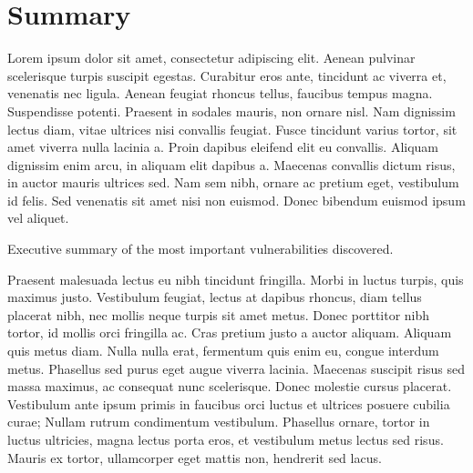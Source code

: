 \chapter{Summary}
Lorem ipsum dolor sit amet, consectetur adipiscing elit. Aenean pulvinar scelerisque turpis suscipit egestas. Curabitur eros ante, tincidunt ac viverra et, venenatis nec ligula. Aenean feugiat rhoncus tellus, faucibus tempus magna. Suspendisse potenti. Praesent in sodales mauris, non ornare nisl. Nam dignissim lectus diam, vitae ultrices nisi convallis feugiat. Fusce tincidunt varius tortor, sit amet viverra nulla lacinia a. Proin dapibus eleifend elit eu convallis. Aliquam dignissim enim arcu, in aliquam elit dapibus a. Maecenas convallis dictum risus, in auctor mauris ultrices sed. Nam sem nibh, ornare ac pretium eget, vestibulum id felis. Sed venenatis sit amet nisi non euismod. Donec bibendum euismod ipsum vel aliquet. 

Executive summary of the most important vulnerabilities discovered.
\makecvsssummary

Praesent malesuada lectus eu nibh tincidunt fringilla. Morbi in luctus turpis, quis maximus justo. Vestibulum feugiat, lectus at dapibus rhoncus, diam tellus placerat nibh, nec mollis neque turpis sit amet metus. Donec porttitor nibh tortor, id mollis orci fringilla ac. Cras pretium justo a auctor aliquam. Aliquam quis metus diam. Nulla nulla erat, fermentum quis enim eu, congue interdum metus. Phasellus sed purus eget augue viverra lacinia. Maecenas suscipit risus sed massa maximus, ac consequat nunc scelerisque. Donec molestie cursus placerat. Vestibulum ante ipsum primis in faucibus orci luctus et ultrices posuere cubilia curae; Nullam rutrum condimentum vestibulum. Phasellus ornare, tortor in luctus ultricies, magna lectus porta eros, et vestibulum metus lectus sed risus. Mauris ex tortor, ullamcorper eget mattis non, hendrerit sed lacus. 
